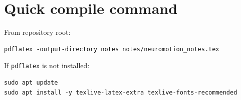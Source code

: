 \documentclass[11pt,a4paper]{article}
\begin{document}
\section{Quick compile command}

From repository root:
\begin{verbatim}
pdflatex -output-directory notes notes/neuromotion_notes.tex
\end{verbatim}

If \texttt{pdflatex} is not installed:
\begin{verbatim}
sudo apt update
sudo apt install -y texlive-latex-extra texlive-fonts-recommended
\end{verbatim}
\end{document}
